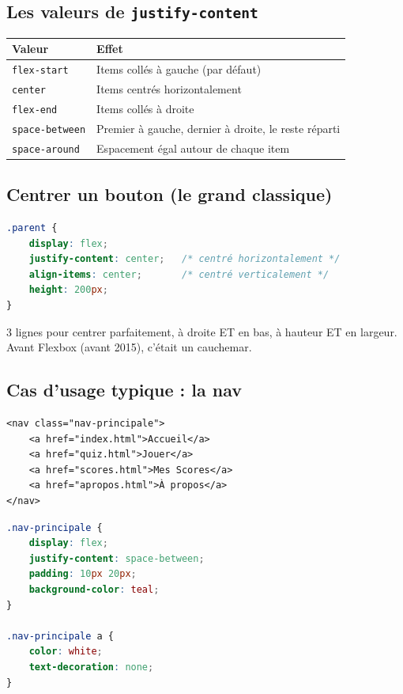 \documentclass[11pt,a4paper]{article}
\begin{document}
\subsection{Les valeurs de \texttt{justify-content}}

\begin{center}
\begin{tabular}{@{}ll@{}}
\toprule
\textbf{Valeur}      & \textbf{Effet} \\
\midrule
\texttt{flex-start}    & Items collés à gauche (par défaut) \\
\texttt{center}        & Items centrés horizontalement \\
\texttt{flex-end}      & Items collés à droite \\
\texttt{space-between} & Premier à gauche, dernier à droite, le reste réparti \\
\texttt{space-around}  & Espacement égal autour de chaque item \\
\bottomrule
\end{tabular}
\end{center}

\subsection{Centrer un bouton (le grand classique)}

\begin{lstlisting}[language=CSS]
.parent {
    display: flex;
    justify-content: center;   /* centré horizontalement */
    align-items: center;       /* centré verticalement */
    height: 200px;
}
\end{lstlisting}

3 lignes pour centrer parfaitement, à droite ET en bas, à hauteur ET en
largeur. Avant Flexbox (avant 2015), c'était un cauchemar.

\subsection{Cas d'usage typique : la nav}

\begin{lstlisting}[language=HTML5]
<nav class="nav-principale">
    <a href="index.html">Accueil</a>
    <a href="quiz.html">Jouer</a>
    <a href="scores.html">Mes Scores</a>
    <a href="apropos.html">À propos</a>
</nav>
\end{lstlisting}

\begin{lstlisting}[language=CSS]
.nav-principale {
    display: flex;
    justify-content: space-between;
    padding: 10px 20px;
    background-color: teal;
}

.nav-principale a {
    color: white;
    text-decoration: none;
}
\end{lstlisting}
\end{document}
